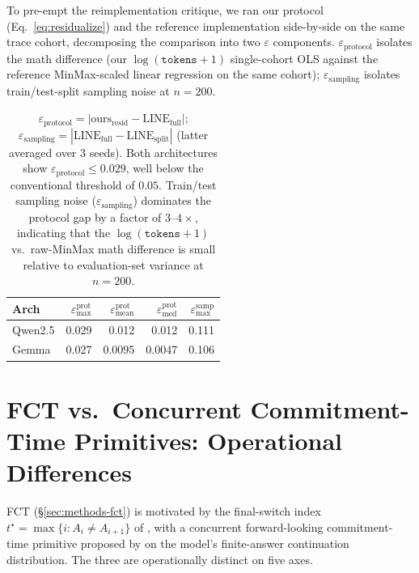 \documentclass[11pt]{article}
\begin{document}
To pre-empt the reimplementation critique, we ran our protocol (Eq.~\ref{eq:residualize}) and the \citet{vashurin_uncertainty-line_2025} reference implementation side-by-side on the same trace cohort, decomposing the comparison into two $\varepsilon$ components. $\varepsilon_{\text{protocol}}$ isolates the math difference (our $\log(\texttt{tokens}+1)$ single-cohort OLS against the reference MinMax-scaled linear regression on the same cohort); $\varepsilon_{\text{sampling}}$ isolates train/test-split sampling noise at $n{=}200$.

\begin{table}[h]
\centering\small
\begin{tabular}{@{}lrrrr@{}}
\toprule
\textbf{Arch} & $\varepsilon^{\text{prot}}_{\max}$ & $\varepsilon^{\text{prot}}_{\text{mean}}$ & $\varepsilon^{\text{prot}}_{\text{med}}$ & $\varepsilon^{\text{samp}}_{\max}$ \\
\midrule
Qwen2.5  & 0.029 & 0.012 & 0.012 & 0.111 \\
Gemma    & 0.027 & 0.0095 & 0.0047 & 0.106 \\
\bottomrule
\end{tabular}
\caption{$\varepsilon_{\text{protocol}} = |\text{ours}_{\text{resid}} - \text{LINE}_{\text{full}}|$; $\varepsilon_{\text{sampling}} = |\text{LINE}_{\text{full}} - \text{LINE}_{\text{split}}|$ (latter averaged over 3 seeds). Both architectures show $\varepsilon_{\text{protocol}} \leq 0.029$, well below the conventional threshold of $0.05$. Train/test sampling noise ($\varepsilon_{\text{sampling}}$) dominates the protocol gap by a factor of $3$--$4\times$, indicating that the $\log(\texttt{tokens}+1)$ vs.\ raw-MinMax math difference is small relative to evaluation-set variance at $n{=}200$.}
\label{tab:uline-repl}
\end{table}

\section{FCT vs.\ Concurrent Commitment-Time Primitives: Operational Differences}
\label{sec:appendix-fct-tstar}

FCT (\S\ref{sec:methods-fct}) is motivated by the final-switch index $t^\star = \max\{i : A_i \neq A_{i+1}\}$ of \citet{datta_large_2026}, with a concurrent forward-looking commitment-time primitive proposed by \citet{zhang_commit_2026} on the model's finite-answer continuation distribution. The three are operationally distinct on five axes.
\end{document}
